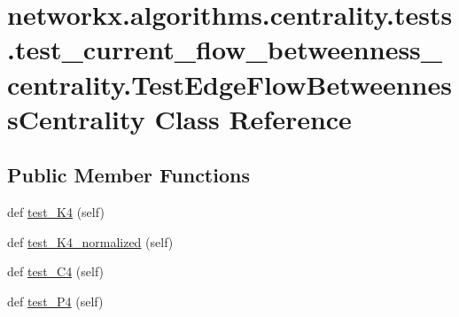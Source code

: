 \hypertarget{classnetworkx_1_1algorithms_1_1centrality_1_1tests_1_1test__current__flow__betweenness__centrali6cda9b8b6c0a181a803da6441b82c92f}{}\section{networkx.\+algorithms.\+centrality.\+tests.\+test\+\_\+current\+\_\+flow\+\_\+betweenness\+\_\+centrality.\+Test\+Edge\+Flow\+Betweenness\+Centrality Class Reference}
\label{classnetworkx_1_1algorithms_1_1centrality_1_1tests_1_1test__current__flow__betweenness__centrali6cda9b8b6c0a181a803da6441b82c92f}
\subsection*{Public Member Functions}
\begin{DoxyCompactItemize}
\item 
def \hyperlink{classnetworkx_1_1algorithms_1_1centrality_1_1tests_1_1test__current__flow__betweenness__centrali6cda9b8b6c0a181a803da6441b82c92f_acf3ac5ae9c736488dc95d00641896fc2}{test\+\_\+\+K4} (self)
\item 
def \hyperlink{classnetworkx_1_1algorithms_1_1centrality_1_1tests_1_1test__current__flow__betweenness__centrali6cda9b8b6c0a181a803da6441b82c92f_af3d3474540128fdbb65358f67a79546f}{test\+\_\+\+K4\+\_\+normalized} (self)
\item 
def \hyperlink{classnetworkx_1_1algorithms_1_1centrality_1_1tests_1_1test__current__flow__betweenness__centrali6cda9b8b6c0a181a803da6441b82c92f_a6179bb25fabaa4409e3c642279ef27cb}{test\+\_\+\+C4} (self)
\item 
def \hyperlink{classnetworkx_1_1algorithms_1_1centrality_1_1tests_1_1test__current__flow__betweenness__centrali6cda9b8b6c0a181a803da6441b82c92f_a582258415e19524c3cb331221b5ee8f9}{test\+\_\+\+P4} (self)
\end{DoxyCompactItemize}



